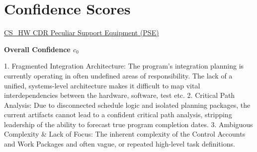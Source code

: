 % 

\section{Confidence Scores}
\begin{frame}{\href{run:../local/source-docs/1.04.01.04.02.19.pdf}{CS\_HW CDR Peculiar Support Equipment (PSE)}}
\centering
{}
\par
\vspace{0.75em}
\textbf{\small{Overall Confidence $c_{0}$}}\\\par
\vspace{0.5em}
\begin{minipage}{0.85\textwidth}
\linespread{0.65}\selectfont
{\tiny{1. Fragmented Integration Architecture: The program's integration planning is currently operating in often undefined areas of responsibility. The lack of a unified, systems-level architecture makes it difficult to map vital interdependencies between the hardware, software, test etc. 2. Critical Path Analysis: Due to disconnected schedule logic and isolated planning packages, the current artifacts cannot lead to a confident critical path analysis, stripping leadership of the ability to forecast true program completion dates. 3. Ambiguous Complexity \& Lack of Focus: The inherent complexity of the Control Accounts and Work Packages and often vague, or repeated high-level task definitions.}}
\end{minipage}
\end{frame}
%
